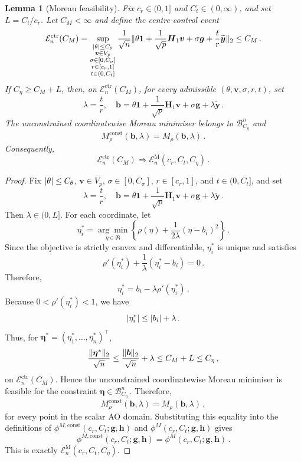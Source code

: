 \documentclass{article}
\makeatletter
\newtheorem{lemma}{Lemma}
\theoremstyle{definition}
\newcommand{\vnorm}[1]{%
	\ensuremath{%
		\if@display
		\left\| #1 \right\|
		\else
		\| #1 \|
		\fi
	}%
}
\newcommand{\abs}[1]{%
	\ensuremath{%
		\if@display
		\left| #1 \right|
		\else
		\lvert #1 \rvert
		\fi
	}%
}
\newcommand*{\bb}{\boldsymbol}
\def\bH {\bb{H}}
\def\bv{\bb{v}}
\def\bh{\bb{h}}
\def\bg{\bb{g}}
\def\bYtil{\widetilde{\bb{y}}}
\def\bH{\bb{H}}
\makeatother
\begin{document}
\begin{bibunit}
\begin{lemma}[Moreau feasibility]
	\label{lemma:moreau_feasibility}
	Fix $c_r\in(0,1]$ and $C_t\in(0,\infty)$, and set $L=C_t/c_r$. Let $C_M<\infty$ and define the centre-control event
	$$
		\mathcal E_n^{\mathrm{ctr}}(C_M)
		=
			\underset{\substack{
			\abs{\theta}\leq C_\theta\\
			\bv\in V_p\\
			\sigma\in[0,C_\sigma]\\
			r\in[c_r,1]\\
			t\in(0,C_t]
			}}{\sup} \, 
			\frac1{\sqrt n}
			\vnorm{
				\theta\bb1
				+
				\frac1{\sqrt p}\bH_1\bv
				+
				\sigma\bg
				+
				\frac tr\bYtil
			}_2
			\leq C_M
		\,.
	$$
If $C_\eta\geq C_M+L$, then, on
$\mathcal E_n^{\mathrm{ctr}}(C_M)$, for every admissible
$(\theta,\bv,\sigma,r,t)$, set
$$
    \lambda=\frac tr,
    \quad
    \bb b
    =
    \theta\bb1
    +
    \frac1{\sqrt p}\bH_1\bv
    +
    \sigma\bg
    +
    \lambda\bYtil \,.
$$
The unconstrained coordinatewise Moreau minimiser belongs to
$\mathcal B^n_{C_\eta}$ and
$$
    M_\rho^{\mathrm{const}}(\bb b,\lambda)
    =
    M_\rho(\bb b,\lambda) \,.
$$
Consequently,
$$
    \mathcal E_n^{\mathrm{ctr}}(C_M)
    \Longrightarrow
    \mathcal E_n^{\mathrm M}(c_r,C_t,C_\eta) \,.
$$
\end{lemma}
\begin{proof}
	Fix $\abs{\theta}\leq C_\theta$, $\bv\in V_p$, $\sigma\in[0,C_\sigma]$, $r\in[c_r,1]$, and $t\in(0,C_t]$,
	and set
	$$
		\lambda=\frac tr,
		\quad
		\bb b=
		\theta\bb1
		+
		\frac1{\sqrt p}\bH_1\bv
		+
		\sigma\bg
		+
		\lambda\bYtil \,.
	$$
	Then $\lambda\in(0,L]$. For each coordinate, let
	$$
		\eta_i^*
		=
		\underset{\eta\in\Re}{\arg\min}
		\left\{
			\rho(\eta)
			+
			\frac{1}{2\lambda}(\eta-b_i)^2
		\right\} \,.
	$$
	Since the objective is strictly convex and differentiable, $\eta_i^*$ is unique and satisfies
	$$
		\rho'(\eta_i^*)
		+
		\frac1\lambda(\eta_i^*-b_i)
		=
		0 \,.
	$$
	Therefore,
	$$
		\eta_i^*
		=
		b_i-\lambda\rho'(\eta_i^*)\,.
	$$
	Because $0<\rho'(\eta_i^*)<1$, we have
	$$
		\abs{\eta_i^*}
		\leq
		\abs{b_i}+\lambda \,.
	$$
	Thus, for $\bb\eta^*=(\eta_1^*,\ldots,\eta_n^*)^\top$,
	$$
		\frac{\vnorm{\bb\eta^*}_2}{\sqrt n}
		\leq
		\frac{\vnorm{\bb b}_2}{\sqrt n}
		+
		\lambda
		\leq
		C_M+L
		\leq
		C_\eta\,,
	$$
	on $\mathcal E_n^{\mathrm{ctr}}(C_M)$. Hence the unconstrained coordinatewise Moreau minimiser is feasible for the constraint $\bb\eta\in\mathcal B^n_{C_\eta}\,.$
	Therefore,
	$$
		M_\rho^{\mathrm{const}}(\bb b,\lambda)
		=
		M_\rho(\bb b,\lambda)\,,
	$$
	for every point in the scalar AO domain. Substituting this equality into the definitions of
	$\phi^{M,\mathrm{const}}(c_r,C_t;\bg,\bh)$ and $\phi^M(c_r,C_t;\bg,\bh)$ gives
	$$
		\phi^{M,\mathrm{const}}(c_r,C_t;\bg,\bh)
		=
		\phi^M(c_r,C_t;\bg,\bh)\,.
	$$
	This is exactly $\mathcal E_n^{\mathrm M}(c_r,C_t,C_\eta)$.
\end{proof}


\end{bibunit}
\end{document}
